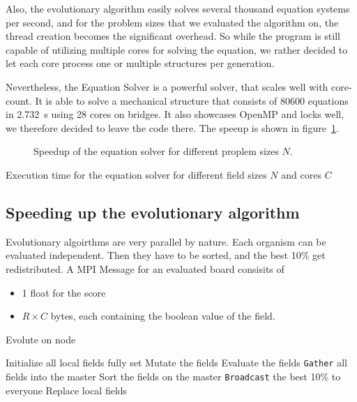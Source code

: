 \documentclass[12pt]{article}
\begin{document}
Also, the evolutionary algorithm easily solves several thousand equation systems per second, and for the problem sizes that we evaluated the algorithm on, the thread creation becomes the significant overhead. So while the program is still capable of utilizing multiple cores for solving the equation, we rather decided to let each core process one or multiple structures per generation.

Nevertheless, the Equation Solver is a powerful solver, that scales well with core-count. It is able to solve a mechanical structure that consists of 80600 equations in \SI{2.732}{\second} using 28 cores on bridges. It also showcases OpenMP and locks well, we therefore decided to leave the code there. The speeup is shown in figure~\ref{fig:Speedup}.

\begin{figure}[t]
    \centering
    
    \caption{Speedup of the equation solver for different proplem sizes $N$.}
    \label{fig:Speedup}
\end{figure}

\begin{table}[t]
    \centering
    
    \caption{Execution time for the equation solver for different field sizes $N$ and cores $C$}
    \label{tab:Speedup}
\end{table}

\subsection{Speeding up the evolutionary algorithm}

Evolutionary algoirthms are very parallel by nature. Each organism can be evaluated independent. Then they have to be sorted, and the best 10\% get redistributed. A MPI Message for an evaluated board consisits of

\begin{itemize}
    \item 1 float for the score
    \item $R \times C$ bytes, each containing the boolean value of the field.
\end{itemize}

\begin{algorithm}[t]
    \caption{Evolute on node}
    \begin{algorithmic}
        \STATE Initialize all local fields fully set
            \STATE Mutate the fields
            \STATE Evaluate the fields
            \STATE \texttt{Gather} all fields into the master
            \STATE Sort the fields on the master
            \STATE \texttt{Broadcast} the best 10\% to everyone
            \STATE Replace local fields
        \ENDFOR
    \end{algorithmic}
    \label{alg:Evolution}
\end{algorithm}
\end{document}

